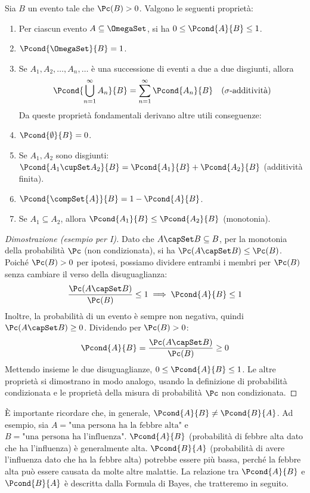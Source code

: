 \begin{theorem}
Sia $B$ un evento tale che $\Pc(B)>0$. Valgono le seguenti proprietà:
\begin{enumerate}[label=\Roman*)]
    \item Per ciascun evento $A \subseteq \OmegaSet$, si ha $0 \le \Pcond{A}{B} \le 1$.
    \item $\Pcond{\OmegaSet}{B} = 1$.
    \item Se $A_1, A_2, \dots, A_n, \dots$ è una successione di eventi a due a due disgiunti, allora
    \[ \Pcond{\bigcup_{n=1}^\infty A_n}{B} = \sum_{n=1}^\infty \Pcond{A_n}{B} \quad (\sigma\text{-additività}) \]
    Da queste proprietà fondamentali derivano altre utili conseguenze:
    \item $\Pcond{\emptyset}{B} = 0$.
    \item Se $A_1, A_2$ sono disgiunti: $\Pcond{A_1 \cupSet A_2}{B} = \Pcond{A_1}{B} + \Pcond{A_2}{B}$ (additività finita).
    \item $\Pcond{\compSet{A}}{B} = 1 - \Pcond{A}{B}$.
    \item Se $A_1 \subseteq A_2$, allora $\Pcond{A_1}{B} \le \Pcond{A_2}{B}$ (monotonia).
\end{enumerate}
\end{theorem}
\begin{proof}[Dimostrazione (esempio per I)]
Dato che $A \capSet B \subseteq B$, per la monotonia della probabilità $\Pc$ (non condizionata), si ha $\Pc(A \capSet B) \le \Pc(B)$.
Poiché $\Pc(B)>0$ per ipotesi, possiamo dividere entrambi i membri per $\Pc(B)$ senza cambiare il verso della disuguaglianza:
\[ \frac{\Pc(A \capSet B)}{\Pc(B)} \le 1 \implies \Pcond{A}{B} \le 1 \]
Inoltre, la probabilità di un evento è sempre non negativa, quindi $\Pc(A \capSet B) \ge 0$. Dividendo per $\Pc(B) > 0$:
\[ \Pcond{A}{B} = \frac{\Pc(A \capSet B)}{\Pc(B)} \ge 0 \]
Mettendo insieme le due disuguaglianze, $0 \le \Pcond{A}{B} \le 1$. Le altre proprietà si dimostrano in modo analogo, usando la definizione di probabilità condizionata e le proprietà della misura di probabilità $\Pc$ non condizionata.
\end{proof}

\begin{remark}
È importante ricordare che, in generale, $\Pcond{A}{B} \neq \Pcond{B}{A}$.
Ad esempio, sia $A = \text{"una persona ha la febbre alta"}$ e $B = \text{"una persona ha l'influenza"}$.
$\Pcond{A}{B}$ (probabilità di febbre alta dato che ha l'influenza) è generalmente alta.
$\Pcond{B}{A}$ (probabilità di avere l'influenza dato che ha la febbre alta) potrebbe essere più bassa, perché la febbre alta può essere causata da molte altre malattie.
La relazione tra $\Pcond{A}{B}$ e $\Pcond{B}{A}$ è descritta dalla Formula di Bayes, che tratteremo in seguito.
\end{remark}



